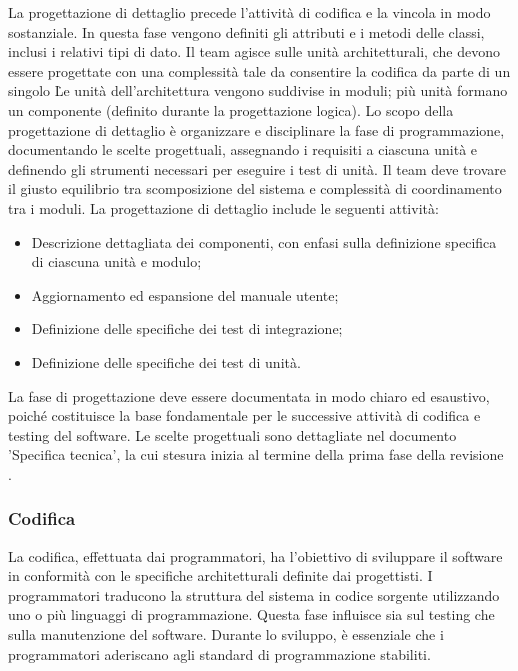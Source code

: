 \label{progettazione-dettaglio}
\par La progettazione di dettaglio precede l’attività di codifica e la vincola in modo sostanziale. In questa fase vengono definiti gli attributi e i metodi delle classi, inclusi i relativi tipi di dato. Il team agisce sulle unità architetturali, che devono essere progettate con una complessità tale da consentire la codifica da parte di un singolo \Programmatore\. Le unità dell’architettura vengono suddivise in moduli; più unità formano un componente (definito durante la progettazione logica). Lo scopo della progettazione di dettaglio è organizzare e disciplinare la fase di programmazione, documentando le scelte progettuali, assegnando i requisiti a ciascuna unità e definendo gli strumenti necessari per eseguire i test di unità. Il team deve trovare il giusto equilibrio tra scomposizione del sistema e complessità di coordinamento tra i moduli. La progettazione di dettaglio include le seguenti attività:
\begin{itemize}
  \item Descrizione dettagliata dei componenti, con enfasi sulla definizione specifica di ciascuna unità e modulo;
  \item Aggiornamento ed espansione del manuale utente;
  \item Definizione delle specifiche dei test di integrazione;
  \item Definizione delle specifiche dei test di unità.
\end{itemize}

\label{specifica-tecnica}
\par La fase di progettazione deve essere documentata in modo chiaro ed esaustivo, poiché costituisce la base fondamentale per le successive attività di codifica e testing del software. Le scelte progettuali sono dettagliate nel documento 'Specifica tecnica', la cui stesura inizia al termine della prima fase della revisione .

\subsubsection{Codifica}\label{codifica}

\par La codifica, effettuata dai programmatori, ha l'obiettivo di sviluppare il software in conformità con le specifiche architetturali definite dai progettisti. I programmatori traducono la struttura del sistema in codice sorgente utilizzando uno o più linguaggi di programmazione. Questa fase influisce sia sul testing che sulla manutenzione del software. Durante lo sviluppo, è essenziale che i programmatori aderiscano agli standard di programmazione stabiliti.

